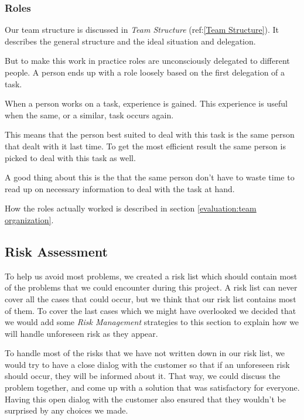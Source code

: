     \subsubsection{Roles}\label{roles}
    
    Our team structure is discussed in \textit{Team Structure} (ref:\ref{Team Structure}). It describes the general structure and the ideal situation and delegation. 
    
    But to make this work in practice roles are unconsciously delegated to different people. A person ends up with a role loosely based on the first delegation of a task. 
    
    When a person works on a task, experience is gained. This experience is useful when the same, or a similar, task occurs again. 
    
    This means that the person best suited to deal with this task is the same person that dealt with it last time. To get the most efficient result the same person is picked to deal with this task as well. 

    A good thing about this is the that the same person don't have to waste time to read up on necessary information to deal with the task at hand.  
    
    How the roles actually worked is described in section \ref{evaluation:team organization}.
        
    \subsection{Risk Assessment}\label{Risk Assessment}
     To help us avoid most problems, we created a risk list which should contain most of the problems that we could encounter during this project. A risk list can never cover all the cases that could occur, but we think that our risk list contains most of them. To cover the last cases which we might have overlooked we decided that we would add some \textit{Risk Management} strategies to this section to explain how we will handle unforeseen risk as they appear. 
     
     To handle most of the risks that we have not written down in our risk list, we would try to have a close dialog with the customer so that if an unforeseen risk should occur, they will be informed about it. That way, we could discuss the problem together, and come up with a solution that was satisfactory for everyone. Having this open dialog with the customer also ensured that they wouldn't be surprised by any choices we made.
     
